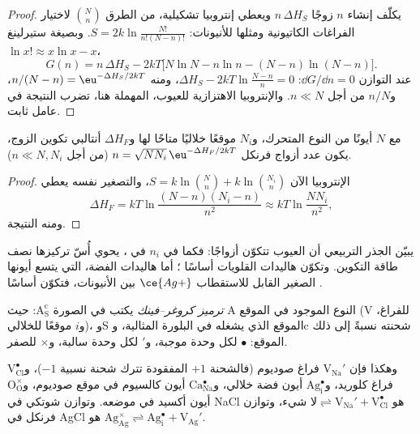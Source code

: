 \begin{proof}
يكلّف إنشاء $n$ زوجًا $n\,\Delta H_S$ ويعطي إنتروبيا تشكيلية، من
الطرق $\binom{N}{n}$ لاختيار الفراغات الكاتيونية ومثلها للأنيونات:
$S = 2k\ln\frac{N!}{n!(N - n)!}$. وبصيغة ستيرلينغ $\ln x! \approx x\ln x - x$،
\[
  G(n) = n\,\Delta H_S - 2kT\bigl[N\ln N - n\ln n - (N - n)\ln(N - n)\bigr].
\]
عند التوازن $\dd G/\dd n = 0$: $\Delta H_S - 2kT\ln\frac{N - n}{n} = 0$، ومنه $n/(N - n) = \eu^{-\Delta H_S/2kT}$، و$n/N$ من أجل
$n \ll N$. والإنتروبيا الاهتزازية للعيوب، المهملة هنا، تضرب
النتيجة في عامل ثابت.
\end{proof}

\begin{proposition}\label{prop:b3:solid-state:frenkel}
مع $N$ أيونًا من النوع المتحرك، و$N_i$ موقعًا خلاليًا متاحًا لها 
و$\Delta H_F$ أنتالبي تكوين الزوج، يكون عدد أزواج فرنكل $n =
\sqrt{NN_i}\,\eu^{-\Delta H_F/2kT}$ (من أجل $n \ll N, N_i$).
\end{proposition}

\begin{proof}
الإنتروبيا الآن $S = k\ln\binom{N}{n} + k\ln\binom{N_i}{n}$، والتصغير نفسه يعطي
\[
  \Delta H_F = kT\ln\frac{(N - n)(N_i - n)}{n^2} \approx kT\ln\frac{NN_i}{n^2},
\]
ومنه النتيجة.
\end{proof}

يبيّن الجذر التربيعي أن العيوب تتكوّن أزواجًا: فكما في $n_i$ في ،
يحوي أُسّ تركيزها نصف طاقة التكوين. وتكوّن هاليدات
القلويات أساسًا ؛ أما هاليدات الفضة، التي يتسع أيونها الصغير القابل للاستقطاب
$\ce{Ag+}$ بين الأنيونات، فتكوّن أساسًا .

\begin{definition}\label{def:b3:solid-state:kroger-vink}
\emph{ترميز كروغر--فينك} يكتب 
في الصورة $\mathrm{A_S^c}$: حيث A النوع الموجود في الموقع (V للفراغ، و$i$ موقعًا
للخلالي)، وS الموقع الذي يشغله في البلورة المثالية، وc شحنته
نسبةً إلى ذلك الموقع: $\bullet$ لكل وحدة موجبة، و$'$ لكل وحدة
سالبة، و$\times$ للصفر.
\end{definition}

وهكذا فإن $\mathrm{V_{Na}'}$ فراغ صوديوم (فالشحنة $+1$ المفقودة تترك شحنة نسبية $-1$)،
و$\mathrm{V_{Cl}^{\bullet}}$ فراغ كلوريد، و$\mathrm{Ag_i^{\bullet}}$ أيون فضة خلالي، و$\mathrm{Ca_{Na}^{\bullet}}$ أيون كالسيوم في
موقع صوديوم، و$\mathrm{O_O^{\times}}$ أيون أكسيد في موضعه. وتوازن شوتكي في NaCl هو
$\text{لا شيء} \rightleftharpoons \mathrm{V_{Na}' + V_{Cl}^{\bullet}}$، وتوازن فرنكل في AgCl هو
$\mathrm{Ag_{Ag}^{\times}} \rightleftharpoons \mathrm{Ag_i^{\bullet} + V_{Ag}'}$.

